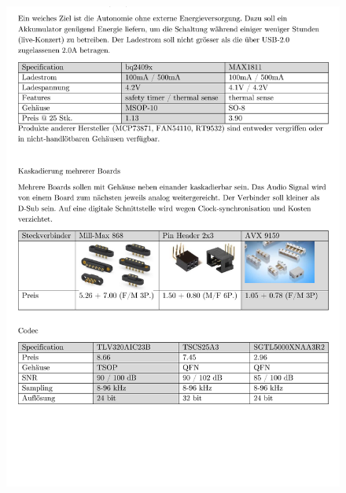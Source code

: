 \begin{appendix}
\begin{figure}[h]
	\centering
	\includegraphics[width=0.95\linewidth]{appendix/pflichtenheft(3).pdf}
\end{figure}


\end{appendix}
